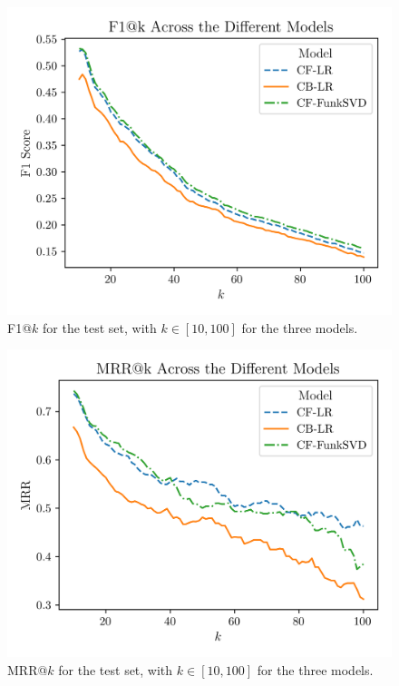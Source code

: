 \documentclass[conference]{IEEEtran}
\begin{document}
\begin{figure}[H]
    \centering
    \includegraphics[width=1\linewidth]{assets/results_f1K.png}
    \caption{F1@$k$ for the test set, with $k \in [10,100]$ for the three models.}
    \label{fig:results_f1K}
\end{figure}

\begin{figure}[H]
    \centering
    \includegraphics[width=1\linewidth]{assets/results_mrrK.png}
    \caption{MRR@$k$ for the test set, with $k \in [10,100]$ for the three models.}
    \label{fig:results_mrrK}
\end{figure}
\end{document}
